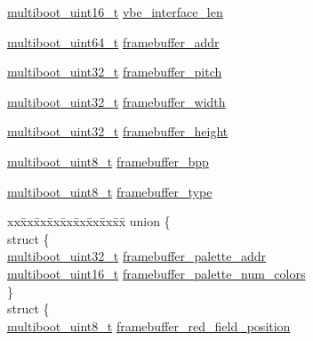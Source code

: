 \begin{DoxyCompactItemize}
\item 
\hyperlink{multiboot_8h_a3a11e3c2b5e0617736a05343aa5795b3}{multiboot\+\_\+uint16\+\_\+t} \hyperlink{structmultiboot__info_ab3c537df524db1ed0aeaa2e6f61a23e6}{vbe\+\_\+interface\+\_\+len}
\item 
\hyperlink{multiboot_8h_a8dfdd61648b48aa31845db590970e06a}{multiboot\+\_\+uint64\+\_\+t} \hyperlink{structmultiboot__info_a17bb708a0853e8618cb208b31d21c3c2}{framebuffer\+\_\+addr}
\item 
\hyperlink{multiboot_8h_a009f355da41fed4badb8a52d432f5186}{multiboot\+\_\+uint32\+\_\+t} \hyperlink{structmultiboot__info_a7d96c148c0360ca105ed700de1a8471b}{framebuffer\+\_\+pitch}
\item 
\hyperlink{multiboot_8h_a009f355da41fed4badb8a52d432f5186}{multiboot\+\_\+uint32\+\_\+t} \hyperlink{structmultiboot__info_a72cac058f9f9ed05738d4d1b003424fd}{framebuffer\+\_\+width}
\item 
\hyperlink{multiboot_8h_a009f355da41fed4badb8a52d432f5186}{multiboot\+\_\+uint32\+\_\+t} \hyperlink{structmultiboot__info_adc94f66e25a23bb66053837c1c0ec758}{framebuffer\+\_\+height}
\item 
\hyperlink{multiboot_8h_a037f602538fccf97e90021c19fdfc047}{multiboot\+\_\+uint8\+\_\+t} \hyperlink{structmultiboot__info_a721623c95cf1c95b61678f1e2289893c}{framebuffer\+\_\+bpp}
\item 
\hyperlink{multiboot_8h_a037f602538fccf97e90021c19fdfc047}{multiboot\+\_\+uint8\+\_\+t} \hyperlink{structmultiboot__info_a98b2122e2f14dcfcbfabb018e602fdfc}{framebuffer\+\_\+type}
\item 
\begin{tabbing}
xx\=xx\=xx\=xx\=xx\=xx\=xx\=xx\=xx\=\kill
union \{\\
\>struct \{\\
\>\>\hyperlink{multiboot_8h_a009f355da41fed4badb8a52d432f5186}{multiboot\_uint32\_t} \hyperlink{structmultiboot__info_a3dedc220bb3e97b53f78a72f66d202e1}{framebuffer\_palette\_addr}\\
\>\>\hyperlink{multiboot_8h_a3a11e3c2b5e0617736a05343aa5795b3}{multiboot\_uint16\_t} \hyperlink{structmultiboot__info_a37f9442827e23b75513f41b2e1674f8d}{framebuffer\_palette\_num\_colors}\\
\>\} \\
\>struct \{\\
\>\>\hyperlink{multiboot_8h_a037f602538fccf97e90021c19fdfc047}{multiboot\_uint8\_t} \hyperlink{structmultiboot__info_a0ba9589c99e3d0968e1cfabed744bfa5}{framebuffer\_red\_field\_position}\\

\end{tabbing}
\end{DoxyCompactItemize}
